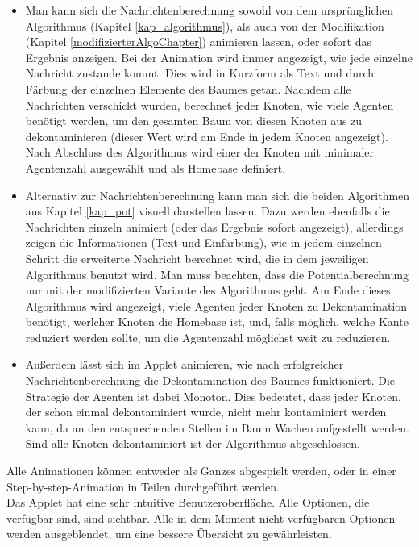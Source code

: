 \begin{itemize}
	\item Man kann sich die Nachrichtenberechnung sowohl von dem ursprünglichen Algorithmus (Kapitel \ref{kap_algorithmus}), als auch von der Modifikation (Kapitel \ref{modifizierterAlgoChapter}) animieren lassen, oder sofort das Ergebnis anzeigen. Bei der Animation wird immer angezeigt, wie jede einzelne Nachricht zustande kommt. Dies wird in Kurzform als Text und durch Färbung der einzelnen Elemente des Baumes getan. Nachdem alle Nachrichten verschickt wurden, berechnet jeder Knoten, wie viele Agenten benötigt werden, um den gesamten Baum von diesen Knoten aus zu dekontaminieren (dieser Wert wird am Ende in jedem Knoten angezeigt). Nach Abschluss des Algorithmus wird einer der Knoten mit minimaler Agentenzahl ausgewählt und als Homebase definiert.
	
	\item Alternativ zur Nachrichtenberechnung kann man sich die beiden Algorithmen aus Kapitel \ref{kap_pot} visuell darstellen lassen. Dazu werden ebenfalls die Nachrichten einzeln animiert (oder das Ergebnis sofort angezeigt), allerdings zeigen die Informationen (Text und Einfärbung), wie in jedem einzelnen Schritt die erweiterte Nachricht berechnet wird, die in dem jeweiligen Algorithmus benutzt wird. Man muss beachten, dass die Potentialberechnung nur mit der modifizierten Variante des Algorithmus geht. Am Ende dieses Algorithmus wird angezeigt, viele Agenten jeder Knoten zu Dekontamination benötigt, werlcher Knoten die Homebase ist, und, falls möglich, welche Kante reduziert werden sollte, um die Agentenzahl möglichst weit zu reduzieren.
	
	\item Außerdem lässt sich im Applet animieren, wie nach erfolgreicher Nachrichtenberechnung die Dekontamination des Baumes funktioniert. Die Strategie der Agenten ist dabei Monoton. Dies bedeutet, dass jeder Knoten, der schon einmal dekontaminiert wurde, nicht mehr kontaminiert werden kann, da an den entsprechenden Stellen im Baum Wachen aufgestellt werden. Sind alle Knoten dekontaminiert ist der Algorithmus abgeschlossen.
\end{itemize}

Alle Animationen können entweder als Ganzes abgespielt werden, oder in einer Step-by-step-Animation in Teilen durchgeführt werden. \\
Das Applet hat eine sehr intuitive Benutzeroberfläche. Alle Optionen, die verfügbar sind, sind sichtbar. Alle in dem Moment nicht verfügbaren Optionen werden ausgeblendet, um eine bessere Übersicht zu gewährleisten.